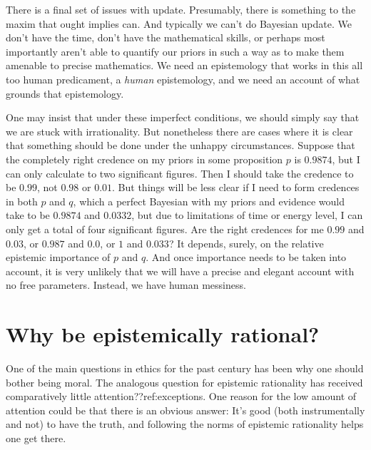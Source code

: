 There is a final set of issues with update. Presumably, there is something to the maxim that ought implies can. And typically 
we can't do Bayesian update. We don't have the time, don't have the mathematical skills, or perhaps most importantly aren't 
able to quantify our priors in such a way as to make them amenable to precise mathematics. We need an epistemology that 
works in this all too human predicament, a \textit{human} epistemology, and we need an account of what grounds that 
epistemology. 

One may insist that under these imperfect conditions, we should simply say that we are stuck with irrationality.
But nonetheless there are cases where it is clear that something should be done under the unhappy circumstances.
Suppose that the completely right credence on my priors in some proposition $p$ is $0.9874$, 
but I can only calculate to two significant figures. Then I should take the credence to be $0.99$, not $0.98$ or 
$0.01$. But things will be less clear if I need to form credences in both $p$ and $q$, which a perfect Bayesian
with my priors and evidence would take to be $0.9874$ and $0.0332$, but due to limitations of
time or energy level, I can only get a total of four significant figures. Are the right credences for me $0.99$
and $0.03$, or $0.987$ and $0.0$, or $1$ and $0.033$? It depends, surely, on the relative epistemic importance of $p$ and
$q$. And once importance needs to be taken into account, it is very unlikely that we will have a precise and elegant
account with no free parameters. Instead, we have human messiness.

\section{Why be epistemically rational?}
One of the main questions in ethics for the past century has been why one should bother being moral. The analogous
question for epistemic rationality has received comparatively little attention??ref:exceptions.
One reason for the low amount of attention could be that there is an obvious answer: It's good 
(both instrumentally and not) to have the truth, and following the norms of epistemic rationality 
helps one get there.

